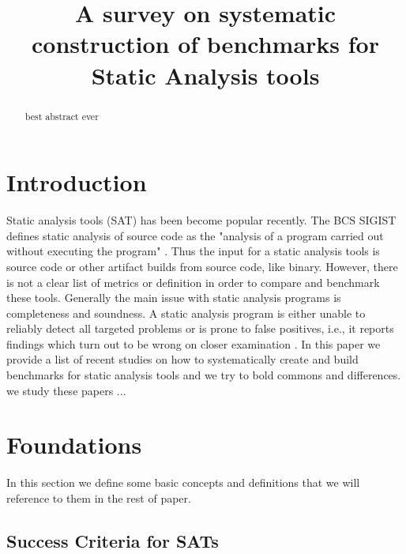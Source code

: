 \documentclass[authoryear,preprint]{sigplanconf}
\begin{document}
\setlength{\pdfpageheight}{\paperheight}
\setlength{\pdfpagewidth}{\paperwidth}


\title{A survey on systematic construction of benchmarks for Static Analysis tools}


\maketitle

\begin{abstract}
best abstract ever
\end{abstract}

\section{Introduction}
\label{sec:introduction}
Static analysis tools (SAT) has been become popular recently. The BCS SIGIST defines static analysis of source code as the "analysis of a program carried out without executing the program" \cite{Glossary_of_term}. Thus the input for a static analysis tools is source code or other artifact builds from source code, like binary. However, there is not a clear list of metrics or definition in order to compare and benchmark these tools. Generally the main issue with static analysis programs is completeness and soundness. A static analysis program is either unable to reliably detect all targeted problems or is prone to false positives, i.e., it reports findings which turn out to be wrong on closer examination \cite{Scanstud}. In this paper we provide a list of recent studies on how to systematically create and build benchmarks for static analysis tools and we try to bold commons and differences. we study these papers ... 

\section{Foundations}
\label{sec:sec_approaches}

In this section we define some basic concepts and definitions that we will reference to them in the rest of paper. 

\subsection{Success Criteria for SATs}
\label{sec:subsec_successc}
\end{document}
